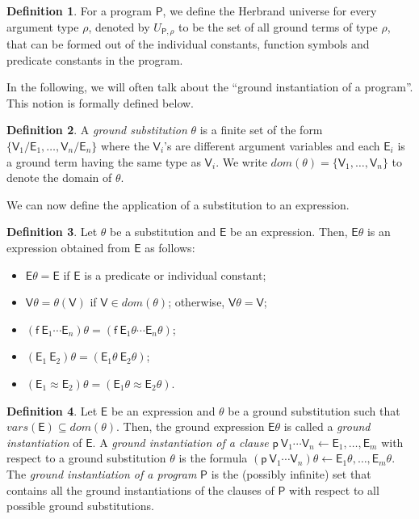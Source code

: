 \documentclass[submission,copyright]{eptcs}
\theoremstyle{definition}
\newtheorem{definition}{Definition}
\begin{document}
\begin{definition}
For a program $\mathsf{P}$, we define the Herbrand universe for every argument type $\rho$, denoted by
$U_{\mathsf{P},\rho}$ to be the set of all ground terms of type $\rho$, that can be formed out of the individual constants, function symbols and predicate constants in the program.
\end{definition}
In the following, we will often talk about the ``ground instantiation of a program''. This
notion is formally defined below.
\begin{definition}
A {\em ground substitution} $\theta$ is a finite set of the form $\{ \mathsf{V}_1/\mathsf{E}_1, \ldots, \mathsf{V}_n/\mathsf{E}_n\}$
where the $\mathsf{V}_i$'s are different argument variables and each $\mathsf{E}_i$
is a ground term having the same type as $\mathsf{V}_i$. We write
$dom(\theta) = \{ \mathsf{V}_1, \ldots, \mathsf{V}_n\}$ to denote the domain of $\theta$.
\end{definition}
We can now define the application of a substitution to an expression.
\begin{definition}
Let $\theta$ be a substitution and $\mathsf{E}$ be an expression. Then, $\mathsf{E}\theta$
is an expression obtained from $\mathsf{E}$ as follows:
\begin{itemize}
  \item $\mathsf{E}\theta = \mathsf{E}$ if $\mathsf{E}$ is a predicate or individual constant;
  \item $\mathsf{V}\theta = \theta(\mathsf{V})$ if $\mathsf{V} \in dom(\theta)$; otherwise, $\mathsf{V}\theta = \mathsf{V}$;
  \item $(\mathsf{f}\ \mathsf{E}_1\cdots\mathsf{E}_n)\theta = (\mathsf{f}\ \mathsf{E}_1\theta\cdots\mathsf{E}_n\theta)$;
  \item $(\mathsf{E}_1\ \mathsf{E}_2)\theta = (\mathsf{E}_1\theta\ \mathsf{E}_2\theta)$;
  \item $(\mathsf{E}_1\approx \mathsf{E}_2)\theta = (\mathsf{E}_1\theta\approx \mathsf{E}_2\theta)$.
\end{itemize}
\end{definition}
\begin{definition}
Let $\mathsf{E}$ be an expression and $\theta$ be a ground substitution such that
$vars(\mathsf{E}) \subseteq dom(\theta)$. Then, the ground expression $\mathsf{E}\theta$
is called a {\em ground instantiation} of $\mathsf{E}$. A {\em ground instantiation of a clause}
$\mathsf{p}\ \mathsf{V}_1 \cdots \mathsf{V}_n \leftarrow \mathsf{E}_1,\ldots,\mathsf{E}_m$
with respect to a ground substitution $\theta$ is the formula
$(\mathsf{p}\ \mathsf{V}_1 \cdots \mathsf{V}_n)\theta \leftarrow \mathsf{E}_1\theta,\ldots,\mathsf{E}_m\theta$.
The {\em ground instantiation of a program} $\mathsf{P}$ is the (possibly infinite)
set that contains all the ground instantiations of the clauses of $\mathsf{P}$
with respect to all possible ground substitutions.
\end{definition}
\end{document}
